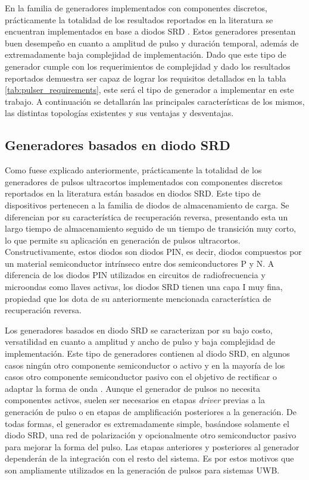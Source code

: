 En la familia de generadores implementados con componentes discretos,
prácticamente la totalidad de los resultados reportados en la literatura se
encuentran implementados en base a diodos SRD \cite{rulikowski2004}
\cite{protiva2009} \cite{kamal2014} \cite{oloumi2020} \cite{han2005}. Estos
generadores presentan buen desempeño en cuanto a amplitud de pulso y duración
temporal, además de extremadamente baja complejidad de implementación. Dado que
este tipo de generador cumple con los requerimientos de complejidad y dado los
resultados reportados demuestra ser capaz de lograr los requisitos detallados en
la tabla \ref{tab:pulser_requirements}, este será el tipo de generador a
implementar en este trabajo. A continuación se detallarán las principales
características de los mismos, las distintas topologías existentes y sus
ventajas y desventajas.

\subsection{Generadores basados en diodo SRD}

Como fuese explicado anteriormente, prácticamente la totalidad de los
generadores de pulsos ultracortos implementados con componentes discretos
reportados en la literatura están basados en diodos SRD. Este tipo de
dispositivos pertenecen a la familia de diodos de almacenamiento de carga. Se
diferencian por su característica de recuperación reversa, presentando esta un
largo tiempo de almacenamiento seguido de un tiempo de transición muy corto, lo
que permite su aplicación en generación de pulsos ultracortos.
Constructivamente, estos diodos son diodos PIN, es decir, diodos compuestos por
un material semiconductor intrínseco entre dos semiconductores P y N. A
diferencia de los diodos PIN utilizados en circuitos de radiofrecuencia y
microondas como llaves activas, los diodos SRD tienen una capa I muy fina,
propiedad que los dota de su anteriormente mencionada característica de
recuperación reversa.

Los generadores basados en diodo SRD se caracterizan por su bajo costo,
versatilidad en cuanto a amplitud y ancho de pulso y baja complejidad de
implementación. Este tipo de generadores contienen al diodo SRD, en algunos
casos ningún otro componente semiconductor o activo \cite{Zhang2006}
\cite{rulikowski2004} \cite{han2005} y en la mayoría de los casos otro
componente semiconductor pasivo con el objetivo de rectificar o adaptar la forma
de onda \cite{protiva2009} \cite{kamal2014} \cite{han2002}. Aunque el generador
de pulsos no necesita componentes activos, suelen ser necesarios en etapas
\textit{driver} previas a la generación de pulso o en etapas de amplificación
posteriores a la generación. De todas formas, el generador es extremadamente
simple, basándose solamente el diodo SRD, una red de polarización y
opcionalmente otro semiconductor pasivo para mejorar la forma del pulso. Las
etapas anteriores y posteriores al generador dependerán de la integración con el
resto del sistema.  Es por estos motivos que son ampliamente utilizados en la
generación de pulsos para sistemas UWB.

